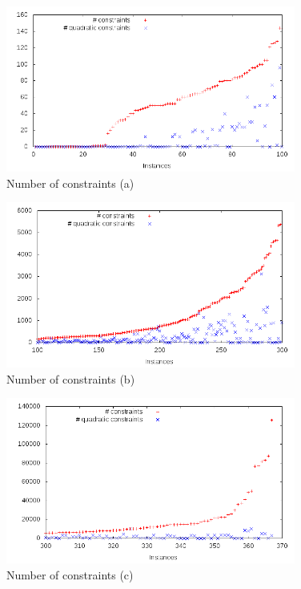\begin{figure}\centering
  \includegraphics[width=0.85\textwidth]{pic_constr_small.png}
  \caption{Number of constraints (a) \label{fig:pic_constr_small}}
\end{figure}

\begin{figure}\centering
  \includegraphics[width=0.85\textwidth]{pic_constr_medium.png}
  \caption{Number of constraints (b) \label{fig:pic_constr_medium}}
\end{figure}

\begin{figure}\centering
  \includegraphics[width=0.85\textwidth]{pic_constr_big.png}
  \caption{Number of constraints (c) \label{fig:pic_constr_big}}
\end{figure}


